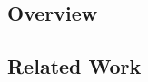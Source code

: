 \documentclass[../main.tex]{subfiles}
\begin{document}
\subsection{Overview}
\subsection{Related Work}
\end{document}

